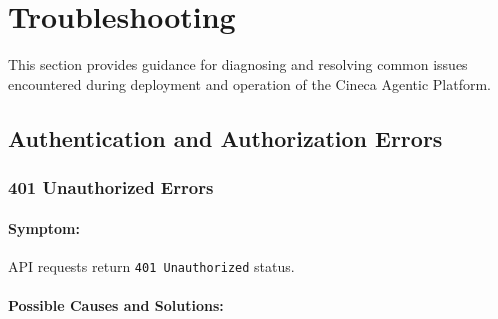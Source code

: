 
\section{Troubleshooting}
\label{sec:troubleshooting}

This section provides guidance for diagnosing and resolving common issues encountered during deployment and operation of the Cineca Agentic Platform.

\subsection{Authentication and Authorization Errors}

\subsubsection{401 Unauthorized Errors}

\paragraph{Symptom:} API requests return \texttt{401 Unauthorized} status.

\paragraph{Possible Causes and Solutions:}

